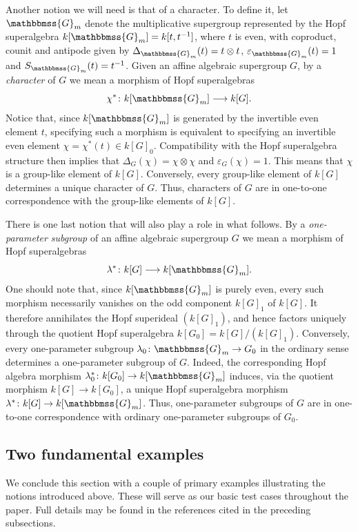 \documentclass[11pt,a4paper,reqno,noamsfonts]{amsart}
\numberwithin{equation}{section}
\theoremstyle{definition}
\theoremstyle{remark}
\newcommand{\GG}{\ensuremath{\mathbbmss{G}}}
\begin{document}
Another notion we will need is that of a character. To define it, let $\GG_m$ denote the multiplicative supergroup represented by the Hopf superalgebra $k[\GG_m] = k[t,t^{-1}]$, where $t$ is even, with coproduct, counit and antipode given by $\Delta_{\GG_m}(t)=t\otimes t$, $\varepsilon_{\GG_m}(t)=1$ and $S_{\GG_m}(t)=t^{-1}$. Given an affine algebraic supergroup $G$, by a \emph{character} of $G$ we mean a morphism of Hopf superalgebras
\begin{equation}
\chi^{*}\colon k[\GG_m]\longrightarrow k[G].
\end{equation}
Notice that, since $k[\GG_m]$ is generated by the invertible even element $t$, specifying such a morphism is equivalent to specifying an invertible even element $\chi=\chi^{*}(t)\in k[G]_0$. Compatibility with the Hopf superalgebra structure then implies that $\Delta_G(\chi)=\chi\otimes\chi$ and $\varepsilon_G(\chi)=1$. This means that $\chi$ is a group-like element of $k[G]$. Conversely, every group-like element of $k[G]$ determines a unique character of $G$. Thus, characters of $G$ are in one-to-one correspondence with the group-like elements of $k[G]$. 

There is one last notion that will also play a role in what follows. By a \emph{one-parameter subgroup} of an affine algebraic supergroup $G$ we mean a morphism of Hopf superalgebras
\begin{equation}
\lambda^{*}\colon k[G]\longrightarrow k[\GG_m].
\end{equation}
One should note that, since $k[\GG_m]$ is purely even, every such morphism necessarily vanishes on the odd component $k[G]_1$ of $k[G]$. It therefore annihilates the Hopf superideal $(k[G]_1)$, and hence factors uniquely through the quotient Hopf superalgebra $k[G_0] = k[G]/(k[G]_1)$. Conversely, every one-parameter subgroup $\lambda_0\colon\GG_m\to G_0$ in the ordinary sense determines a one-parameter subgroup of $G$. Indeed, the corresponding Hopf algebra morphism $\lambda_0^{*}\colon k[G_0]\to k[\GG_m]$ induces, via the quotient morphism $k[G]\to k[G_0]$, a unique Hopf superalgebra morphism $\lambda^{*}\colon k[G]\to k[\GG_m]$. Thus, one-parameter subgroups of $G$ are in one-to-one correspondence with ordinary one-parameter subgroups of $G_0$.

%
\subsection{Two fundamental examples}\label{sec:2.5}
We conclude this section with a couple of primary examples illustrating the notions introduced above. These will serve as our basic test cases throughout the paper. Full details may be found in the references cited in the preceding subsections.
\end{document}
